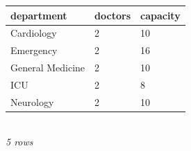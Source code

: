{\scriptsize\setlength{\tabcolsep}{2.5pt}\begin{tabular}{lll}\toprule
\textbf{department} & \textbf{doctors} & \textbf{capacity} \\\midrule
Cardiology & 2 & 10 \\
Emergency & 2 & 16 \\
General Medicine & 2 & 10 \\
ICU & 2 & 8 \\
Neurology & 2 & 10 \\
\bottomrule\end{tabular}}\\[-1pt]{\tiny\itshape 5 rows}
